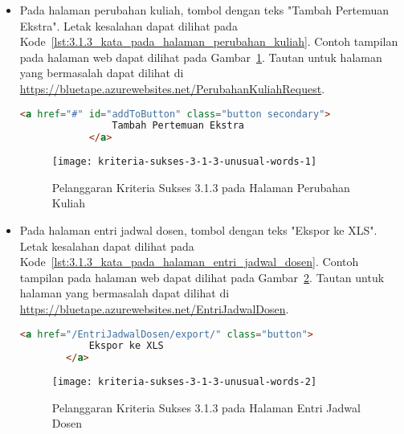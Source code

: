 \begin{itemize}
    \item Pada halaman perubahan kuliah, tombol dengan teks "Tambah Pertemuan Ekstra". Letak kesalahan dapat dilihat pada \mbox{Kode \ref{lst:3.1.3_kata_pada_halaman_perubahan_kuliah}}. Contoh tampilan pada halaman web dapat dilihat pada \mbox{Gambar \ref{fig:3.1.3_unusual_words_1}}. Tautan untuk halaman yang bermasalah dapat dilihat di \url{https://bluetape.azurewebsites.net/PerubahanKuliahRequest}.
    \begin{lstlisting}[frame=single, label={lst:3.1.3_kata_pada_halaman_perubahan_kuliah}, language=HTML, caption=Pelanggaran Kriteria Sukses 3.1.3 pada Halaman Perubahan Kuliah]
            <a href="#" id="addToButton" class="button secondary">
                Tambah Pertemuan Ekstra
            </a>
    \end{lstlisting}
    
    \begin{figure}[H]
        \centering  
        \texttt{[image: kriteria-sukses-3-1-3-unusual-words-1]}  
        \caption[Pelanggaran Kriteria Sukses 3.1.3 pada Halaman Perubahan Kuliah]{Pelanggaran Kriteria Sukses 3.1.3 pada Halaman Perubahan Kuliah}
        \label{fig:3.1.3_unusual_words_1}  
    \end{figure}
    
    \item Pada halaman entri jadwal dosen, tombol dengan teks "Ekspor ke XLS". Letak kesalahan dapat dilihat pada \mbox{Kode \ref{lst:3.1.3_kata_pada_halaman_entri_jadwal_dosen}}. Contoh tampilan pada halaman web dapat dilihat pada \mbox{Gambar \ref{fig:3.1.3_unusual_words_2}}. Tautan untuk halaman yang bermasalah dapat dilihat di \url{https://bluetape.azurewebsites.net/EntriJadwalDosen}.
    \begin{lstlisting}[frame=single, label={lst:3.1.3_kata_pada_halaman_entri_jadwal_dosen}, language=HTML, caption=Pelanggaran Kriteria Sukses 3.1.3 pada Halaman Entri Jadwal Dosen]
        <a href="/EntriJadwalDosen/export/" class="button">
            Ekspor ke XLS
        </a>
    \end{lstlisting}
    
    \begin{figure}[H]
        \centering  
        \texttt{[image: kriteria-sukses-3-1-3-unusual-words-2]}  
        \caption[Pelanggaran Kriteria Sukses 3.1.3 pada Halaman Entri Jadwal Dosen]{Pelanggaran Kriteria Sukses 3.1.3 pada Halaman Entri Jadwal Dosen}
        \label{fig:3.1.3_unusual_words_2}  
    \end{figure}


\end{itemize}
